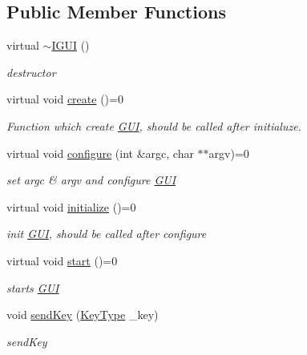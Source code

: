 \subsection*{Public Member Functions}
\begin{DoxyCompactItemize}
\item 
virtual \hyperlink{class_i_g_u_i_a76d35859d9c3e8f8eb07620b6b410180}{$\sim$\+I\+G\+U\+I} ()
\begin{DoxyCompactList}\small\item\em destructor \end{DoxyCompactList}\item 
virtual void \hyperlink{class_i_g_u_i_af1c9039be9e29c34bc70eeae7de91fe5}{create} ()=0
\begin{DoxyCompactList}\small\item\em Function which create \hyperlink{class_g_u_i}{G\+U\+I}, should be called after initialuze. \end{DoxyCompactList}\item 
virtual void \hyperlink{class_i_g_u_i_ae28e4e2c51d9d3209b9ad0dfb08c9fa6}{configure} (int \&argc, char $\ast$$\ast$argv)=0
\begin{DoxyCompactList}\small\item\em set argc \& argv and configure \hyperlink{class_g_u_i}{G\+U\+I} \end{DoxyCompactList}\item 
virtual void \hyperlink{class_i_g_u_i_af315e9117ea57f0e76175639e75d549e}{initialize} ()=0
\begin{DoxyCompactList}\small\item\em init \hyperlink{class_g_u_i}{G\+U\+I}, should be called after configure \end{DoxyCompactList}\item 
virtual void \hyperlink{class_i_g_u_i_af82e18ade2dd8fc7bab06a3381fd210b}{start} ()=0
\begin{DoxyCompactList}\small\item\em starts \hyperlink{class_g_u_i}{G\+U\+I} \end{DoxyCompactList}\item 
void \hyperlink{class_i_g_u_i_a7ac246e96d4b4b96180a83c8e62329da}{send\+Key} (\hyperlink{_i_key_type_8h_aab0feaba617470cb4aa830dc5935238c}{Key\+Type} \+\_\+key)
\begin{DoxyCompactList}\small\item\em send\+Key \end{DoxyCompactList}\end{DoxyCompactItemize}
